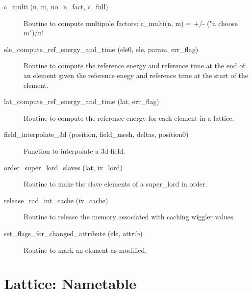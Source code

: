 \begin{description}

\label{r:c.multi}
\item[c_multi (n, m, no_n_fact, c_full)] \Newline
Routine to compute multipole factors: 
c_multi(n, m) = +/- ("n choose m")/n! 

\label{r:ele.compute.ref.energy.and.time}
\item[ele_compute_ref_energy_and_time (ele0, ele, param, err_flag)] \Newline 
Routine to compute the reference energy and reference time at the end
of an element given the reference enegy and reference time at the
start of the element.

\label{r:lat.compute.ref.energy.and.time}
\item[lat_compute_ref_energy_and_time (lat, err_flag)] \Newline
Routine to compute the reference energy for each element in a lattice. 

\label{r:field.interpolate.3d}
\item[field_interpolate_3d (position, field_mesh, deltas, position0)] \Newline
Function to interpolate a 3d field. 

\label{r:order.super.lord.slaves}
\item[order_super_lord_slaves (lat, ix_lord)] \Newline
Routine to make the slave elements of a super_lord in order. 

\label{r:release.rad.int.cache}
\item[release_rad_int_cache (ix_cache)] \Newline 
     Routine to release the memory associated with caching wiggler values.

\label{r:set.flags.for.changed.attribute}
\item[set_flags_for_changed_attribute (ele, attrib)] \Newline 
Routine to mark an element as modified.

\end{description}

\section{Lattice: Nametable}
\label{r:lat.nametab}

